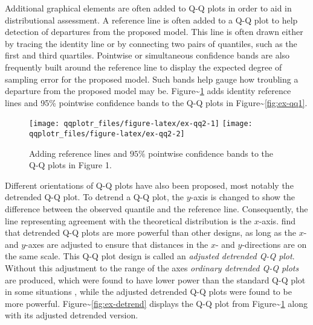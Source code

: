 Additional graphical elements are often added to Q-Q plots in order to
aid in distributional assessment. A reference line is often added to a
Q-Q plot to help detection of departures from the proposed model. This
line is often drawn either by tracing the identity line or by connecting
two pairs of quantiles, such as the first and third quartiles. Pointwise
or simultaneous confidence bands are also frequently built around the
reference line to display the expected degree of sampling error for the
proposed model. Such bands help gauge how troubling a departure from the
proposed model may be. Figure\textasciitilde{}\ref{fig:ex-qq2} adds
identity reference lines and 95\% pointwise confidence bands to the Q-Q
plots in Figure\textasciitilde{}\ref{fig:ex-qq1}.

\begin{Schunk}
\begin{figure}

{\centering \texttt{[image: qqplotr\_files/figure-latex/ex-qq2-1]} \texttt{[image: qqplotr\_files/figure-latex/ex-qq2-2]} 

}

\caption[Adding reference lines and $95\%$ pointwise confidence bands to the Q-Q plots in Figure 1]{Adding reference lines and $95\%$ pointwise confidence bands to the Q-Q plots in Figure 1.}\label{fig:ex-qq2}
\end{figure}
\end{Schunk}

Different orientations of Q-Q plots have also been proposed, most
notably the detrended Q-Q plot. To detrend a Q-Q plot, the \(y\)-axis is
changed to show the difference between the observed quantile and the
reference line. Consequently, the line representing agreement with the
theoretical distribution is the \(x\)-axis. \citet{Loy2016-fg} find that
detrended Q-Q plots are more powerful than other designs, as long as the
\(x\)- and \(y\)-axes are adjusted to ensure that distances in the
\(x\)- and \(y\)-directions are on the same scale. This Q-Q plot design
is called an \emph{adjusted detrended Q-Q plot}. Without this adjustment
to the range of the axes \emph{ordinary detrended Q-Q plots} are
produced, which were found to have lower power than the standard Q-Q
plot in some situations \citep{Loy2016-fg}, while the adjusted detrended
Q-Q plots were found to be more powerful.
Figure\textasciitilde{}\ref{fig:ex-detrend} displays the Q-Q plot from
Figure\textasciitilde{}\ref{fig:ex-qq2} along with its adjusted
detrended version.

